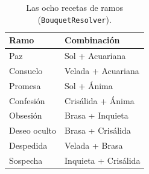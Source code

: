 \documentclass[12pt,twoside,titlepage]{report}
\begin{document}
\begin{table}[H]
  \centering
  \caption{Las ocho recetas de ramos (\texttt{BouquetResolver}).}
  \begin{footnotesize}
  \renewcommand{\arraystretch}{1.3}
  \begin{tabular}{p{3.4cm}p{5cm}}
    \hline
    \textbf{Ramo} & \textbf{Combinación} \\
    \hline
    Paz & Sol + Acuariana \\
    \hline
    Consuelo & Velada + Acuariana \\
    \hline
    Promesa & Sol + Ánima \\
    \hline
    Confesión & Crisálida + Ánima \\
    \hline
    Obsesión & Brasa + Inquieta \\
    \hline
    Deseo oculto & Brasa + Crisálida \\
    \hline
    Despedida & Velada + Brasa \\
    \hline
    Sospecha & Inquieta + Crisálida \\
    \hline
  \end{tabular}
  \end{footnotesize}
\end{table}
\end{document}

